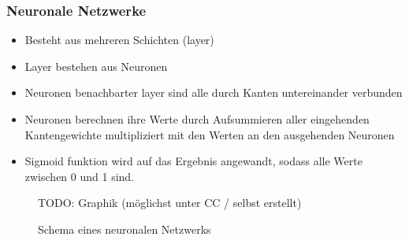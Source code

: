 \begin{frame}
    \frametitle{Neuronale Netzwerke}
    \begin{itemize}
        \item Besteht aus mehreren Schichten (layer)
        \item Layer bestehen aus Neuronen
        \item Neuronen benachbarter layer sind alle durch Kanten untereinander verbunden
        \item Neuronen berechnen ihre Werte durch Aufsummieren aller eingehenden Kantengewichte multipliziert mit den Werten an den ausgehenden Neuronen
        \item Sigmoid funktion wird auf das Ergebnis angewandt, sodass alle Werte zwischen 0 und 1 sind.
    \end{itemize}
    \begin{figure}
        TODO: Graphik (möglichst unter CC / selbst erstellt)
        \caption{Schema eines neuronalen Netzwerks}
    \end{figure}
\end{frame}
